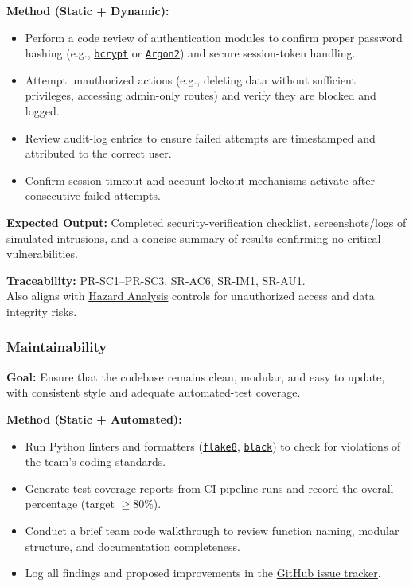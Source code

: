 \documentclass[12pt, titlepage]{article}
\begin{document}
\textbf{Method (Static + Dynamic):}
\begin{itemize}
  \item Perform a code review of authentication modules to confirm proper password hashing (e.g., \texttt{\href{https://www.npmjs.com/package/bcrypt}{bcrypt}} or \texttt{\href{https://argon2.online/}{Argon2}}) and secure session-token handling.
  \item Attempt unauthorized actions (e.g., deleting data without sufficient privileges, accessing admin-only routes) and verify they are blocked and logged.
  \item Review audit-log entries to ensure failed attempts are timestamped and attributed to the correct user.
  \item Confirm session-timeout and account lockout mechanisms activate after consecutive failed attempts.
\end{itemize}

\textbf{Expected Output:} Completed security-verification checklist, screenshots/logs of simulated intrusions, and a concise summary of results confirming no critical vulnerabilities.

\textbf{Traceability:} PR-SC1--PR-SC3, SR-AC6, SR-IM1, SR-AU1.\\
Also aligns with \href{https://github.com/thaafei/DomainX/blob/main/docs/HazardAnalysis/HazardAnalysis.pdf}{Hazard Analysis} controls for unauthorized access and data integrity risks.

\subsubsection{Maintainability}
\label{subsubsec:maintainability}

\textbf{Goal:} Ensure that the codebase remains clean, modular, and easy to update, with consistent style and adequate automated-test coverage.

\textbf{Method (Static + Automated):}
\begin{itemize}
  \item Run Python linters and formatters (\texttt{\href{https://flake8.pycqa.org/en/latest/}{flake8}}, \texttt{\href{https://github.com/psf/black}{black}}) to check for violations of the team’s coding standards.
  \item Generate test-coverage reports from CI pipeline runs and record the overall percentage (target \(\ge 80\%\)).
  \item Conduct a brief team code walkthrough to review function naming, modular structure, and documentation completeness.
  \item Log all findings and proposed improvements in the \href{https://github.com/thaafei/DomainX/issues}{GitHub issue tracker}.
\end{itemize}
\end{document}
